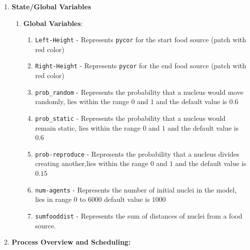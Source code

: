 \documentclass[a4paper, 12pt]{article}
\begin{document}
\begin{enumerate}
    
    \item \textbf{State/Global Variables}
    \begin{enumerate}
        \item \textbf{Global Variables}:
    \begin{enumerate}
        \item \texttt{Left-Height} - Represents \texttt{pycor} for the start food source (patch with red color)
        \item \texttt{Right-Height} - Represents \texttt{pycor} for the end food source (patch with red color)
        \item \texttt{prob\_random} - Represents the probability that a nucleus would move randomly, lies within the range $0$ and $1$ and the default value is $0.6$
        \item \texttt{prob\_static} - Represents the probability that a nucleus would remain static, lies within the range $0$ and $1$ and the default value is $0.6$
        \item \texttt{prob-reproduce} - Represents the probability that a nucleus divides creating another,lies within the range $0$ and $1$ and the default value is $0.15$
        \item \texttt{num-agents} - Represents the number of initial nuclei in the model, lies in range $0$ to $6000$ default value is $1000$
        \item \texttt{sumfooddist} - Represents the sum of distances of nuclei from a food source.
    \end{enumerate}
    \end{enumerate}
    
    \item \textbf{Process Overview and Scheduling:} 
    
    

\end{enumerate}
\end{document}
